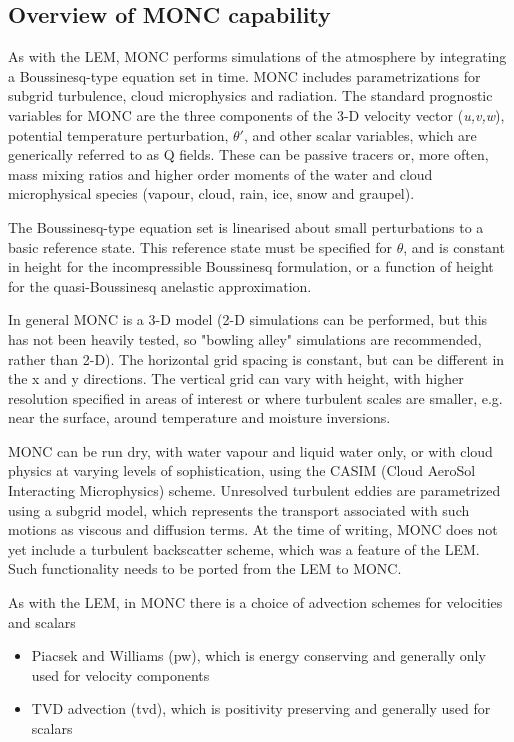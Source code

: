 \documentclass[a4paper,11pt]{article}
\begin{document}
\subsection{Overview of MONC capability}

As with the LEM, MONC performs simulations of the atmosphere by integrating a Boussinesq-type
equation set in time. MONC includes parametrizations for subgrid turbulence,
cloud microphysics and radiation. The standard prognostic variables for MONC are the three
components of the 3-D velocity vector (\emph{u,v,w}), potential temperature perturbation,
$\theta{'}$, and other scalar variables, which are generically referred to as Q fields.
These can be passive tracers or, more often, mass mixing ratios and higher
order moments of the water and cloud microphysical species (vapour, cloud, rain, ice,
snow and graupel).

The Boussinesq-type equation set is linearised about small
perturbations to a basic reference state. This reference state must
be specified for $\theta$, and is constant in height for the incompressible
Boussinesq formulation, or a function of height for the quasi-Boussinesq
anelastic approximation.

In general MONC is a 3-D model (2-D simulations can be performed, but this has not
been heavily tested, so "bowling alley" simulations are recommended, rather than 2-D).
The horizontal grid spacing is constant, but can be different in the x and y
directions. The vertical grid can vary with height, with higher resolution specified
in areas of interest or where turbulent scales are smaller, e.g. near the surface,
around temperature and moisture inversions.

MONC can be run dry, with water vapour and liquid water only, or with cloud
physics at varying levels of sophistication, using the CASIM (Cloud AeroSol Interacting
Microphysics) scheme. Unresolved turbulent eddies are parametrized
using a subgrid model, which represents the transport associated with such motions as
viscous and diffusion terms. At the time of writing, MONC does not yet include a turbulent
backscatter scheme, which was a feature of the LEM. Such functionality needs to be
ported from the LEM to MONC.

As with the LEM, in MONC there is a choice of advection schemes for velocities
and scalars
\begin{itemize}
  \item {Piacsek and Williams (pw), which is energy conserving and generally only
  used for velocity components}
  \item {TVD advection (tvd), which is positivity preserving and generally used for
  scalars}
\end{itemize}
\end{document}
